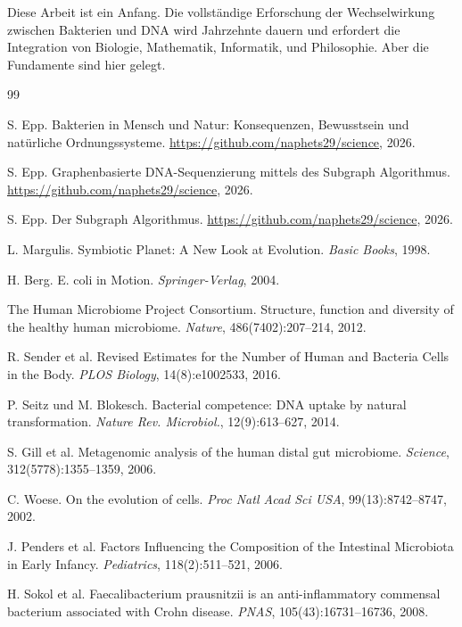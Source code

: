 \documentclass[a4paper,12pt]{article}
\theoremstyle{definition}
\begin{document}
Diese Arbeit ist ein Anfang. Die vollständige Erforschung der Wechselwirkung zwischen Bakterien und DNA wird Jahrzehnte dauern und erfordert die Integration von Biologie, Mathematik, Informatik, und Philosophie. Aber die Fundamente sind hier gelegt.

\begin{thebibliography}{99}

    S. Epp.
    Bakterien in Mensch und Natur: Konsequenzen, Bewusstsein und natürliche Ordnungssysteme.
    \url{https://github.com/naphets29/science}, 2026.

    S. Epp.
    Graphenbasierte DNA-Sequenzierung mittels des Subgraph Algorithmus.
    \url{https://github.com/naphets29/science}, 2026.

    S. Epp.
    Der Subgraph Algorithmus.
    \url{https://github.com/naphets29/science}, 2026.

    L. Margulis.
    Symbiotic Planet: A New Look at Evolution.
    \textit{Basic Books}, 1998.

    H. Berg.
    E. coli in Motion.
    \textit{Springer-Verlag}, 2004.

    The Human Microbiome Project Consortium.
    Structure, function and diversity of the healthy human microbiome.
    \textit{Nature}, 486(7402):207--214, 2012.

    R. Sender et al.
    Revised Estimates for the Number of Human and Bacteria Cells in the Body.
    \textit{PLOS Biology}, 14(8):e1002533, 2016.

    P. Seitz und M. Blokesch.
    Bacterial competence: DNA uptake by natural transformation.
    \textit{Nature Rev. Microbiol.}, 12(9):613--627, 2014.

    S. Gill et al.
    Metagenomic analysis of the human distal gut microbiome.
    \textit{Science}, 312(5778):1355--1359, 2006.

    C. Woese.
    On the evolution of cells.
    \textit{Proc Natl Acad Sci USA}, 99(13):8742--8747, 2002.

    J. Penders et al.
    Factors Influencing the Composition of the Intestinal Microbiota in Early Infancy.
    \textit{Pediatrics}, 118(2):511--521, 2006.

    H. Sokol et al.
    Faecalibacterium prausnitzii is an anti-inflammatory commensal bacterium associated with Crohn disease.
    \textit{PNAS}, 105(43):16731--16736, 2008.


\end{thebibliography}
\end{document}
